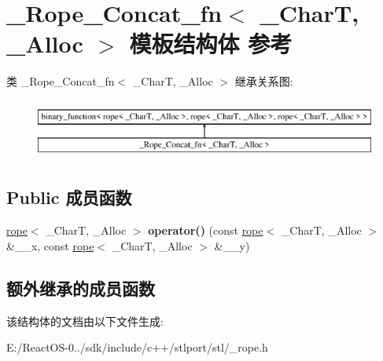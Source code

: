 \hypertarget{struct___rope___concat__fn}{}\section{\+\_\+\+Rope\+\_\+\+Concat\+\_\+fn$<$ \+\_\+\+CharT, \+\_\+\+Alloc $>$ 模板结构体 参考}
\label{struct___rope___concat__fn}
类 \+\_\+\+Rope\+\_\+\+Concat\+\_\+fn$<$ \+\_\+\+CharT, \+\_\+\+Alloc $>$ 继承关系图\+:\begin{figure}[H]
\begin{center}
\leavevmode
\includegraphics[height=1.996435cm]{struct___rope___concat__fn}
\end{center}
\end{figure}
\subsection*{Public 成员函数}
\begin{DoxyCompactItemize}
\item 
\mbox{\label{struct___rope___concat__fn_abd6390acbb9f75ee5cf8eef087f36530}} 
\hyperlink{classrope}{rope}$<$ \+\_\+\+CharT, \+\_\+\+Alloc $>$ {\bfseries operator()} (const \hyperlink{classrope}{rope}$<$ \+\_\+\+CharT, \+\_\+\+Alloc $>$ \&\+\_\+\+\_\+x, const \hyperlink{classrope}{rope}$<$ \+\_\+\+CharT, \+\_\+\+Alloc $>$ \&\+\_\+\+\_\+y)
\end{DoxyCompactItemize}
\subsection*{额外继承的成员函数}


该结构体的文档由以下文件生成\+:\begin{DoxyCompactItemize}
\item 
E\+:/\+React\+O\+S-\/0../sdk/include/c++/stlport/stl/\+\_\+rope.\+h\end{DoxyCompactItemize}
